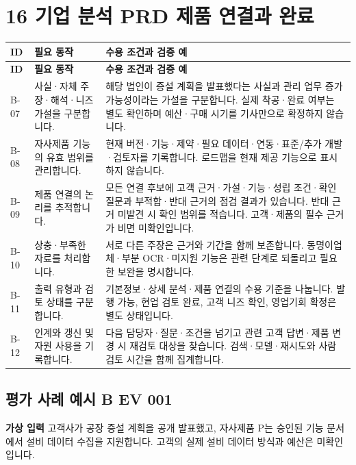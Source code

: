 \documentclass[a4paper,10pt]{article}
\newcommand{\Hline}{\noalign{\hrule height 1.5pt}}
\begin{document}
\clearpage
\section*{16 기업 분석 PRD 제품 연결과 완료}
{\fontsize{9.5}{14.06}\selectfont
\begin{longtable}{!{\vrule width 1.5pt}L{18.94mm}|L{55.23mm}|L{83.63mm}!{\vrule width 1.5pt}}
\Hline{} \textbf{ID} & \textbf{필요 동작} & \textbf{수용 조건과 검증 예}\\\hline\endfirsthead
\Hline{} \textbf{ID} & \textbf{필요 동작} & \textbf{수용 조건과 검증 예}\\\hline\endhead
\hline\endfoot\Hline\endlastfoot
B-07 & 사실·자체 주장·해석·니즈 가설을 구분합니다. & 해당 법인이 증설 계획을 발표했다는 사실과 관리 업무 증가 가능성이라는 가설을 구분합니다. 실제 착공·완료 여부는 별도 확인하며 예산·구매 시기를 기사만으로 확정하지 않습니다.\\\hline
B-08 & 자사제품 기능의 유효 범위를 관리합니다. & 현재 버전·기능·제약·필요 데이터·연동·표준/추가 개발·검토자를 기록합니다. 로드맵을 현재 제공 기능으로 표시하지 않습니다.\\\hline
B-09 & 제품 연결의 논리를 추적합니다. & 모든 연결 후보에 고객 근거·가설·기능·성립 조건·확인 질문과 부적합·반대 근거의 점검 결과가 있습니다. 반대 근거 미발견 시 확인 범위를 적습니다. 고객·제품의 필수 근거가 비면 미확인입니다.\\\hline
B-10 & 상충·부족한 자료를 처리합니다. & 서로 다른 주장은 근거와 기간을 함께 보존합니다. 동명이업체·부분 OCR·미지원 기능은 관련 단계로 되돌리고 필요한 보완을 명시합니다.\\\hline
B-11 & 출력 유형과 검토 상태를 구분합니다. & 기본정보·상세 분석·제품 연결의 수용 기준을 나눕니다. 발행 가능, 현업 검토 완료, 고객 니즈 확인, 영업기회 확정은 별도 상태입니다.\\\hline
B-12 & 인계와 갱신 및 자원 사용을 기록합니다. & 다음 담당자·질문·조건을 넘기고 관련 고객 답변·제품 변경 시 재검토 대상을 찾습니다. 검색·모델·재시도와 사람 검토 시간을 함께 집계합니다.\\\hline
\end{longtable}}
\subsection*{평가 사례 예시 B EV 001}
\noindent\textbf{가상 입력} 고객사가 공장 증설 계획을 공개 발표했고, 자사제품 P는 승인된 기능 문서에서 설비 데이터 수집을 지원합니다. 고객의 실제 설비 데이터 방식과 예산은 미확인입니다.
\end{document}
